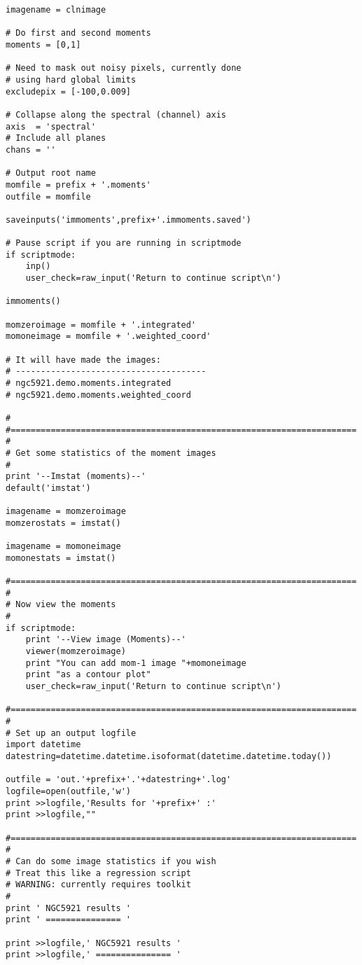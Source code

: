 \begin{verbatim}
imagename = clnimage

# Do first and second moments
moments = [0,1]

# Need to mask out noisy pixels, currently done
# using hard global limits
excludepix = [-100,0.009]

# Collapse along the spectral (channel) axis
axis  = 'spectral'
# Include all planes
chans = ''

# Output root name
momfile = prefix + '.moments'
outfile = momfile

saveinputs('immoments',prefix+'.immoments.saved')

# Pause script if you are running in scriptmode
if scriptmode:
    inp()
    user_check=raw_input('Return to continue script\n')

immoments()

momzeroimage = momfile + '.integrated'
momoneimage = momfile + '.weighted_coord'

# It will have made the images:
# --------------------------------------
# ngc5921.demo.moments.integrated
# ngc5921.demo.moments.weighted_coord

#
#=====================================================================
#
# Get some statistics of the moment images
#
print '--Imstat (moments)--'
default('imstat')

imagename = momzeroimage
momzerostats = imstat()

imagename = momoneimage
momonestats = imstat()

#=====================================================================
#
# Now view the moments
#
if scriptmode:
    print '--View image (Moments)--'
    viewer(momzeroimage)
    print "You can add mom-1 image "+momoneimage
    print "as a contour plot"
    user_check=raw_input('Return to continue script\n')

#=====================================================================
#
# Set up an output logfile
import datetime
datestring=datetime.datetime.isoformat(datetime.datetime.today())

outfile = 'out.'+prefix+'.'+datestring+'.log'
logfile=open(outfile,'w')
print >>logfile,'Results for '+prefix+' :'
print >>logfile,""

#=====================================================================
#
# Can do some image statistics if you wish
# Treat this like a regression script
# WARNING: currently requires toolkit
#
print ' NGC5921 results '
print ' =============== '

print >>logfile,' NGC5921 results '
print >>logfile,' =============== '


\end{verbatim}
